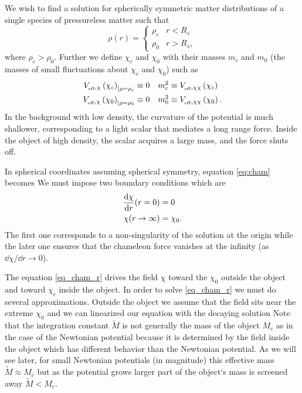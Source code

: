 We wish to find a solution for spherically symmetric matter distributions of a single species of pressureless matter such that
\begin{equation*}
\rho(r)=
\begin{cases}
\rho_c & r<R_s \\
\rho_0 & r>R_s,
\end{cases}
\end{equation*}
where $\rho_c>\rho_0$. Further we define $\chi_c$ and $\chi_0$ with their masses $m_c$ and $m_0$ (the masses of small fluctuations about $\chi_c$ and $\chi_0$) such as
\begin{align*}
V_{_\text{\tiny eff},\chi}\left(\chi_c\right)_{|\rho=\rho_c}&\equiv0	&	m^2_c&\equiv V_{_\text{\tiny eff},\chi\chi}\left(\chi_c\right) \\
V_{_\text{\tiny eff},\chi}\left(\chi_0\right)_{|\rho=\rho_0}&\equiv0	&	m^2_0&\equiv V_{_\text{\tiny eff},\chi\chi}\left(\chi_0\right).
\end{align*}
In the background with low density, the curvature of the potential is much shallower, corresponding to a light scalar that mediates a long range force. Inside the object of high density, the scalar acquires a large mass, and the force shuts off.

In spherical coordinates assuming spherical symmetry, equation \eqref{eq:cham} becomes
We must impose two boundary conditions which are
\begin{align*}
\frac{\mbox{d} \chi}{\mbox{d} r}(r=0)&=0 \\
\chi(r\rightarrow\infty)&=\chi_0.
\end{align*}
The first one corresponds to a non-singularity of the solution at the origin while the later one ensures that the chameleon force vanishes at the infinity (as $\dd\chi/\dd r\rightarrow0$).

The equation \eqref{eq_cham_r} drives the field $\chi$ toward the $\chi_0$ outside the object and toward $\chi_c$ inside the object. In order to solve \eqref{eq_cham_r} we must do several approximations. Outside the object we assume that the field sits near the extreme $\chi_0$ and we can linearized our equation
with the decaying solution
Note that the integration constant $\tilde{M}$ is not generally the mass of the object $M_c$ as in the case of the Newtonian potential because it is determined by the field inside the object which has different behavior than the Newtonian potential. As we will see later, for small Newtonian potentials (in magnitude) this effective mass $\tilde{M}\approx M_c$ but as the potential grows larger part of the object`s mass is screened away $\tilde{M}< M_c$.

